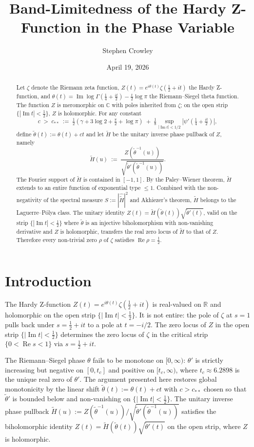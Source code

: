 \documentclass[11pt]{article}
\title{Band-Limitedness of the Hardy Z-Function in the Phase Variable}
\author{Stephen Crowley}
\date{April 19, 2026}
\DeclareMathOperator{\ImOp}{Im}
\DeclareMathOperator{\ReOp}{Re}
\let\Im\ImOp
\let\Re\ReOp
\begin{document}
\maketitle

\begin{abstract}
Let $\zeta$ denote the Riemann zeta function, $Z(t) = e^{i\theta(t)}\zeta(\tfrac{1}{2}+it)$ the Hardy Z-function, and $\theta(t) = \Im\log\Gamma(\tfrac{1}{4}+\tfrac{it}{2}) - \tfrac{t}{2}\log\pi$ the Riemann--Siegel theta function. The function $Z$ is meromorphic on $\mathbb{C}$ with poles inherited from $\zeta$; on the open strip $\{|\Im t|<\tfrac{1}{2}\}$, $Z$ is holomorphic. For any constant
\[
c \;>\; c_{**} \;:=\; \tfrac{1}{2}\!\left(\gamma + 3\log 2 + \tfrac{\pi}{2} + \log\pi\right) \;+\; \tfrac{1}{8}\sup_{|\Im t|<1/2}\!\left|\psi'(\tfrac{1}{4}+\tfrac{it}{2})\right|,
\]
define $\tilde\theta(t) := \theta(t) + ct$ and let $\tilde H$ be the unitary inverse phase pullback of $Z$, namely
\[
\tilde H(u) \;:=\; \frac{Z(\tilde\theta^{-1}(u))}{\sqrt{\tilde\theta'(\tilde\theta^{-1}(u))}}.
\]
The Fourier support of $\tilde H$ is contained in $[-1,1]$. By the Paley--Wiener theorem, $\tilde H$ extends to an entire function of exponential type $\le 1$. Combined with the non-negativity of the spectral measure $S:=|\widehat{\tilde H}|^2$ and Akhiezer's theorem, $\tilde H$ belongs to the Laguerre--P\'olya class. The unitary identity $Z(t) = \tilde H(\tilde\theta(t))\sqrt{\tilde\theta'(t)}$, valid on the strip $\{|\Im t| < \tfrac{1}{2}\}$ where $\tilde\theta$ is an injective biholomorphism with non-vanishing derivative and $Z$ is holomorphic, transfers the real zero locus of $\tilde H$ to that of $Z$. Therefore every non-trivial zero $\rho$ of $\zeta$ satisfies $\Re\rho = \tfrac{1}{2}$.
\end{abstract}

\section{Introduction}

The Hardy Z-function $Z(t) = e^{i\theta(t)}\zeta(\tfrac{1}{2}+it)$ is real-valued on $\mathbb{R}$ and holomorphic on the open strip $\{|\Im t|<\tfrac{1}{2}\}$. It is not entire: the pole of $\zeta$ at $s=1$ pulls back under $s=\tfrac{1}{2}+it$ to a pole at $t=-i/2$. The zero locus of $Z$ in the open strip $\{|\Im t|<\tfrac{1}{2}\}$ determines the zero locus of $\zeta$ in the critical strip $\{0<\Re s<1\}$ via $s=\tfrac{1}{2}+it$.

The Riemann--Siegel phase $\theta$ fails to be monotone on $[0,\infty)$: $\theta'$ is strictly increasing but negative on $[0,t_c]$ and positive on $[t_c,\infty)$, where $t_c\approx 6.2898$ is the unique real zero of $\theta'$. The argument presented here restores global monotonicity by the linear shift $\tilde\theta(t):=\theta(t)+ct$ with $c>c_{**}$ chosen so that $\tilde\theta'$ is bounded below and non-vanishing on $\{|\Im t|<\tfrac{1}{2}\}$. The unitary inverse phase pullback $\tilde H(u):=Z(\tilde\theta^{-1}(u))/\sqrt{\tilde\theta'(\tilde\theta^{-1}(u))}$ satisfies the biholomorphic identity $Z(t)=\tilde H(\tilde\theta(t))\sqrt{\tilde\theta'(t)}$ on the open strip, where $Z$ is holomorphic.
\end{document}
